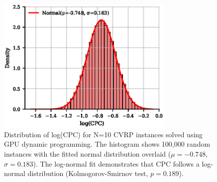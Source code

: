 \documentclass[a4paper,twoside]{article}
\begin{document}
\begin{figure}[t!]
\centering
   \includegraphics[width=85mm]{figures/log_norm_N10.eps}
   \caption{Distribution of log(CPC) for N=10 CVRP instances solved using GPU dynamic programming. The histogram shows 100,000 random instances with the fitted normal distribution overlaid ($\mu=-0.748$, $\sigma=0.183$). The log-normal fit demonstrates that CPC follows a log-normal distribution (Kolmogorov-Smirnov test, $p=0.189$).}
\label{fig:benchmark}
\end{figure}
\end{document}
